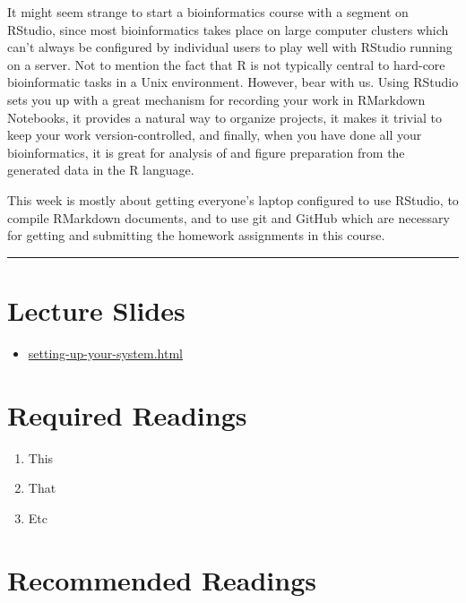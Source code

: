 \documentclass[]{book}
\providecommand{\tightlist}{%
  \setlength{\itemsep}{0pt}\setlength{\parskip}{0pt}}
\begin{document}
It might seem strange to start a bioinformatics course with a segment
on RStudio, since most bioinformatics takes place on large computer
clusters which can't always be configured by individual users to
play well with RStudio running on a server. Not to mention the fact that
R is not typically central to hard-core bioinformatic tasks in a
Unix environment. However, bear with us. Using RStudio sets you up
with a great mechanism for recording your work in RMarkdown Notebooks,
it provides a natural way to organize projects, it makes it trivial
to keep your work version-controlled, and finally, when you have done
all your bioinformatics, it is great for analysis of and figure preparation from
the generated data in the R language.

This week is mostly about getting everyone's laptop configured
to use RStudio, to compile RMarkdown documents, and to use git and GitHub which
are necessary for getting and submitting the homework assignments in this course.

\begin{center}\rule{0.5\linewidth}{\linethickness}\end{center}

\hypertarget{lecture-slides}{%
\section{Lecture Slides}\label{lecture-slides}}

\begin{itemize}
\tightlist
\item
  \href{slides-and-things/setting-up-your-system.html}{setting-up-your-system.html}
\end{itemize}

\hypertarget{required-readings}{%
\section*{Required Readings}\label{required-readings}}

\begin{enumerate}
\def\labelenumi{\arabic{enumi}.}
\tightlist
\item
  This
\item
  That
\item
  Etc
\end{enumerate}

\hypertarget{recommended-readings}{%
\section*{Recommended Readings}\label{recommended-readings}}
\end{document}
